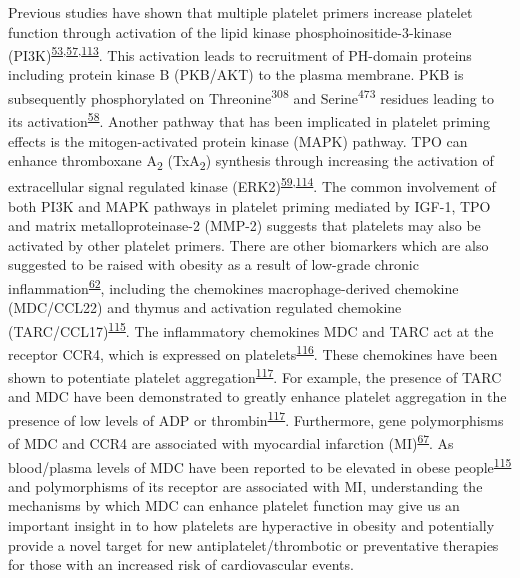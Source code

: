 \documentclass[11pt,twoside]{bristolthesis}
\begin{document}
Previous studies have shown that multiple platelet primers increase platelet function through activation of the lipid kinase phosphoinositide-3-kinase (PI3K)\textsuperscript{\protect\hyperlink{ref-Blair2015}{53},\protect\hyperlink{ref-Pasquet2000}{57},\protect\hyperlink{ref-Falcinelli2005}{113}}. This activation leads to recruitment of PH-domain proteins including protein kinase B (PKB/AKT) to the plasma membrane. PKB is subsequently phosphorylated on Threonine\textsuperscript{308} and Serine\textsuperscript{473} residues leading to its activation\textsuperscript{\protect\hyperlink{ref-Hemmings2015}{58}}. Another pathway that has been implicated in platelet priming effects is the mitogen-activated protein kinase (MAPK) pathway. TPO can enhance thromboxane A\textsubscript{2} (TxA\textsubscript{2}) synthesis through increasing the activation of extracellular signal regulated kinase (ERK2)\textsuperscript{\protect\hyperlink{ref-Ezumi1998}{59},\protect\hyperlink{ref-VanWilligen2000}{114}}. The common involvement of both PI3K and MAPK pathways in platelet priming mediated by IGF-1, TPO and matrix metalloproteinase-2 (MMP-2) suggests that platelets may also be activated by other platelet primers. There are other biomarkers which are also suggested to be raised with obesity as a result of low-grade chronic inflammation\textsuperscript{\protect\hyperlink{ref-Esser2014}{62}}, including the chemokines macrophage-derived chemokine (MDC/CCL22) and thymus and activation regulated chemokine (TARC/CCL17)\textsuperscript{\protect\hyperlink{ref-Safa2016}{115}}. The inflammatory chemokines MDC and TARC act at the receptor CCR4, which is expressed on platelets\textsuperscript{\protect\hyperlink{ref-Clemetson2000}{116}}. These chemokines have been shown to potentiate platelet aggregation\textsuperscript{\protect\hyperlink{ref-Gear2001}{117}}. For example, the presence of TARC and MDC have been demonstrated to greatly enhance platelet aggregation in the presence of low levels of ADP or thrombin\textsuperscript{\protect\hyperlink{ref-Gear2001}{117}}. Furthermore, gene polymorphisms of MDC and CCR4 are associated with myocardial infarction (MI)\textsuperscript{\protect\hyperlink{ref-Noori2018}{67}}. As blood/plasma levels of MDC have been reported to be elevated in obese people\textsuperscript{\protect\hyperlink{ref-Safa2016}{115}} and polymorphisms of its receptor are associated with MI, understanding the mechanisms by which MDC can enhance platelet function may give us an important insight in to how platelets are hyperactive in obesity and potentially provide a novel target for new antiplatelet/thrombotic or preventative therapies for those with an increased risk of cardiovascular events.
\end{document}
